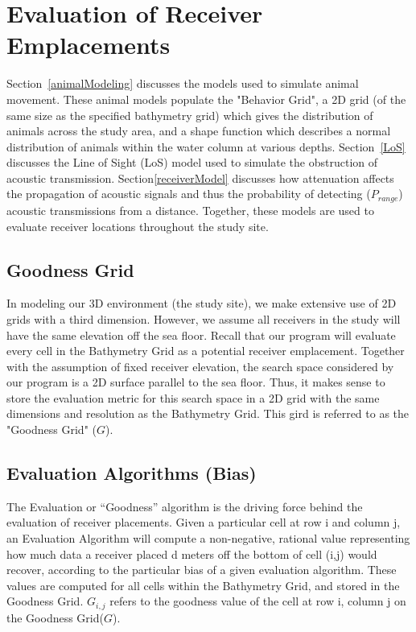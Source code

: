\section{Evaluation of Receiver Emplacements}
\label{evaluationOfReceiver}
Section~\ref{animalModeling} discusses the models used to simulate animal movement.  These animal models populate the "Behavior Grid", a 2D grid (of the same size as the specified bathymetry grid) which gives the distribution of animals across the study area, and a shape function which describes a normal distribution of animals within the water column at various depths.  Section~\ref{LoS} discusses the Line of Sight (LoS) model used to simulate the obstruction of acoustic transmission.  Section\ref{receiverModel} discusses how attenuation affects the propagation of acoustic signals and thus the probability of detecting ($P_{range}$) acoustic transmissions from a distance.  Together, these models are used to evaluate receiver locations throughout the study site.  


\subsection{Goodness Grid}
\label{goodnessGrid}
In modeling our 3D environment (the study site), we make extensive use of 2D grids with a third dimension.  However, we assume all receivers in the study will have the same elevation off the sea floor.  Recall that our program will evaluate every cell in the Bathymetry Grid as a potential receiver emplacement.  Together with the assumption of fixed receiver elevation, the search space considered by our program is a 2D surface parallel to the sea floor.  Thus, it makes sense to store the evaluation metric for this search space in a 2D grid with the same dimensions and resolution as the Bathymetry Grid.  This gird is referred to as the "Goodness Grid" ($G$).  

\subsection{Evaluation Algorithms (Bias)}
The Evaluation or “Goodness” algorithm is the driving force behind the evaluation of receiver placements.  Given a particular cell at row i and column j, an Evaluation Algorithm will compute a non-negative, rational value representing how much data a receiver placed d meters off the bottom of cell (i,j) would recover, according to the particular bias of a given evaluation algorithm.  These values are computed for all cells within the Bathymetry Grid, and stored in the Goodness Grid.  $G_{i,j}$ refers to the goodness value of the cell at row i, column j on the Goodness Grid($G$).  

